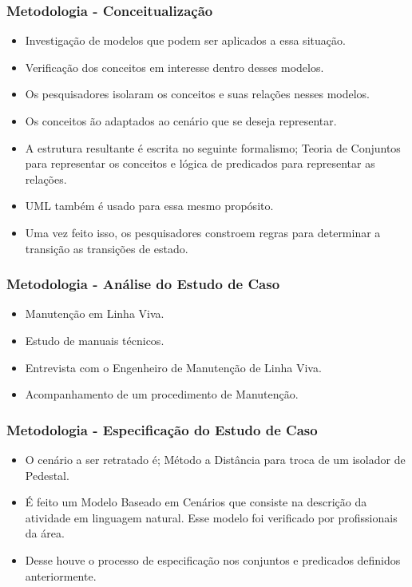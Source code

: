 \documentclass{beamer}
\begin{document}
\begin{frame}
	\frametitle{Metodologia - Conceitualização}
	\begin{itemize}
		\item Investigação de modelos que podem ser aplicados a essa situação.
		\item Verificação dos conceitos em interesse dentro desses modelos. 
		\item Os pesquisadores isolaram os conceitos e suas relações nesses modelos. 
		\item Os conceitos ão adaptados ao cenário que se deseja representar.
		\item A estrutura resultante é escrita no seguinte formalismo; Teoria de Conjuntos para representar os conceitos e lógica de predicados para representar as relações. 
		\item UML também é usado para essa mesmo propósito. 
		\item Uma vez feito isso, os pesquisadores constroem regras para determinar a transição as transições de estado.
	\end{itemize} 
\end{frame}

\begin{frame}
	\frametitle{Metodologia - Análise do Estudo de Caso}
	\begin{itemize}
		\item Manutenção em Linha Viva. 
		\item Estudo de manuais técnicos. 
		\item Entrevista com o Engenheiro de Manutenção de Linha Viva. 
		\item Acompanhamento de um procedimento de Manutenção. 
	\end{itemize} 
\end{frame}

\begin{frame}
	\frametitle{Metodologia - Especificação do Estudo de Caso}
	\begin{itemize}
		\item O cenário a ser retratado é; Método a Distância para troca de um isolador de Pedestal. 
		\item É feito um Modelo Baseado em Cenários que consiste na descrição da atividade em linguagem natural. Esse modelo foi verificado por profissionais da área. 
		\item Desse houve o processo de especificação nos conjuntos e predicados definidos anteriormente. 
	\end{itemize} 
\end{frame}
\end{document}
